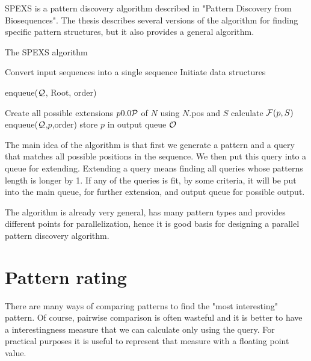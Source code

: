 SPEXS is a pattern discovery algorithm described in "Pattern Discovery from Biosequences"\cite{spexs}. The thesis describes several versions of the algorithm for finding specific pattern structures, but it also provides a general algorithm.

\begin{algorithm}[H]
	\caption{The SPEXS algorithm}
\begin{algorithmic}[1]

	\State Convert input sequences into a single sequence
	\State Initiate data structures

	\State enqueue($\mathcal{Q}$, Root, order)

		\State Create all possible extensions $p \in \sym{P}$ of $N$ using $N$.pos and $S$
				\State calculate $\mathcal{F}(p,S)$
				\State enqueue($\mathcal{Q}$,$p$,order)
					\State store $p$ in output queue $\mathcal{O}$
				\EndIf
			\EndIf
		\EndFor
	\EndWhile
\end{algorithmic}
\end{algorithm}

The main idea of the algorithm is that first we generate a pattern and a query that matches all possible positions in the sequence. We then put this query into a queue for extending. Extending a query means finding all queries whose patterns length is longer by 1. If any of the queries is fit, by some criteria, it will be put into the main queue, for further extension, and output queue for possible output.

The algorithm is already very general, has many pattern types and provides different points for parallelization, hence it is good basis for designing a parallel pattern discovery algorithm.

\section{Pattern rating}

There are many ways of comparing patterns to find the "most interesting" pattern. Of course, pairwise comparison is often wasteful and it is better to have a interestingness measure that we can calculate only using the query. For practical purposes it is useful to represent that measure with a floating point value.

